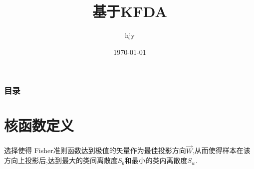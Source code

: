 \documentclass[12pt,a4paper,CJK]{beamer}
\author{hjy}
\title{基于KFDA}
\institute{TongJi University}
\date{\today}
\begin{document}
\begin{CJK*}{UTF8}{gkai}
\begin{frame} 				
	\titlepage 
\end{frame}
	
\begin{frame}
	\frametitle{目录}
	\tableofcontents
\end{frame}



\section{核函数定义}
\begin{frame}{\secname}
		选择使得 Fisher准则函数达到极值的矢量作为最佳投影方向$\overrightarrow{W}$,从而使得样本在该方向上投影后,达到最大的类间离散度$S_b$和最小的类内离散度$S_w$.
		
		
		
		
\end{frame}



\end{CJK*}
\end{document}

